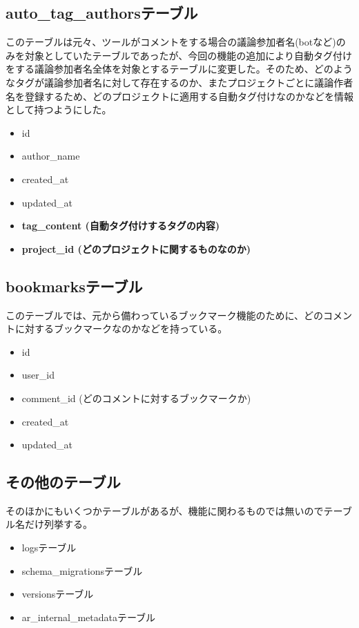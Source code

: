 \documentclass[12pt, oneside]{jreport}
\begin{document}
		\subsection{auto\_tag\_authorsテーブル}
		このテーブルは元々、ツールがコメントをする場合の議論参加者名(botなど)のみを対象としていたテーブルであったが、今回の機能の追加により自動タグ付けをする議論参加者名全体を対象とするテーブルに変更した。そのため、どのようなタグが議論参加者名に対して存在するのか、またプロジェクトごとに議論作者名を登録するため、どのプロジェクトに適用する自動タグ付けなのかなどを情報として持つようにした。
		\begin{itemize}
		\item id
		\item author\_name
		\item created\_at
		\item updated\_at
		\item {\bf tag\_content (自動タグ付けするタグの内容)}
		\item {\bf project\_id (どのプロジェクトに関するものなのか)}
		\end{itemize}

		\subsection{bookmarksテーブル}
		このテーブルでは、元から備わっているブックマーク機能のために、どのコメントに対するブックマークなのかなどを持っている。
		\begin{itemize}
		\item id
		\item user\_id
		\item comment\_id (どのコメントに対するブックマークか)
		\item created\_at
		\item updated\_at
		\end{itemize}
		
		\subsection{その他のテーブル}
		
		そのほかにもいくつかテーブルがあるが、機能に関わるものでは無いのでテーブル名だけ列挙する。
		
		\begin{itemize}
		\item logsテーブル
		\item schema\_migrationsテーブル
		\item versionsテーブル
		\item ar\_internal\_metadataテーブル
		\end{itemize}
	
\end{document}
